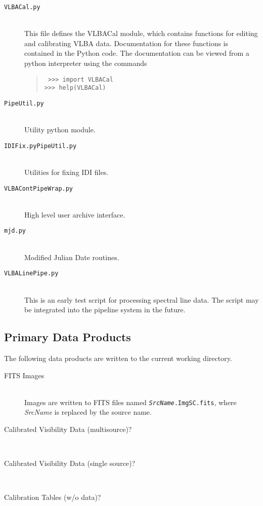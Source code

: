 \documentclass[10pt,onecolumn,final]{IEEEtran}
\begin{document}
\begin{description}
\item[\tt VLBACal.py] \hfill \\ This file defines the VLBACal module,
which contains functions for editing and calibrating VLBA data.
Documentation for these functions is contained in the Python code.
The documentation can be viewed from a python interpreter using the commands   
\begin{quote}\tt 
>>> import VLBACal \\
>>> help(VLBACal)
\end{quote}

\item[\tt PipeUtil.py] \hfill \\ Utility python module.

\item[\tt IDIFix.pyPipeUtil.py] \hfill \\ Utilities for fixing IDI files.

\item[\tt VLBAContPipeWrap.py ] \hfill \\ High level user archive
interface.

\item[\tt mjd.py ] \hfill \\ Modified Julian Date routines.

\item[\tt VLBALinePipe.py] \hfill \\  This is an early test script for processing spectral line data.  The script may be integrated into the pipeline system in the future.
\end{description}

\subsection{Primary Data Products}

The following data products are written to the current working directory.

\begin{description}
\item[FITS Images] \hfill \\ Images are written to FITS files named {\tt{\em SrcName}.ImgSC.fits}, where {\em SrcName} is replaced by the source name.

\item[Calibrated Visibility Data (multisource)?] \hfill \\ 

\item[Calibrated Visibility Data (single source)?] \hfill \\ 

\item[Calibration Tables (w/o data)?] \hfill %
\end{description}
\end{document}
